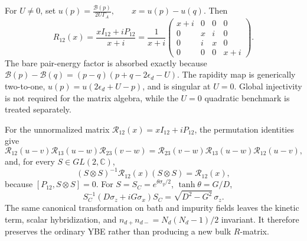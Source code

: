 \documentclass[%
  aps,physrev,onecolumn,10pt,amsmath,amssymb,superscriptaddress,longbibliography,floatfix
]{revtex4-2}
\begin{document}
For \(U\ne0\), set $u(p)=\frac{\mathcal B(p)}{2U\Gamma_A},\qquad x=u(p)-u(q)$.
Then
\begin{equation}
R_{12}(x)=\frac{xI_{12}+iP_{12}}{x+i}
=\frac{1}{x+i}
\begin{pmatrix}
x+i&0&0&0\\
0&x&i&0\\
0&i&x&0\\
0&0&0&x+i
\end{pmatrix}.
\label{eq:R4_explicit_app}
\end{equation}
The bare pair-energy factor is absorbed exactly because $\mathcal B(p)-\mathcal B(q) =(p-q)(p+q-2\epsilon_d-U)$.
The rapidity map is generically two-to-one,
\(u(p)=u(2\epsilon_d+U-p)\), and is singular at \(U=0\).  Global
injectivity is not required for the matrix algebra, while the \(U=0\)
quadratic benchmark is treated separately.

For the unnormalized matrix
\(\mathcal R_{12}(x)=xI_{12}+iP_{12}\), the permutation identities give
\begin{equation}
\mathcal R_{12}(u-v)\mathcal R_{13}(u-w)\mathcal R_{23}(v-w)
=\mathcal R_{23}(v-w)\mathcal R_{13}(u-w)\mathcal R_{12}(u-v),
\label{eq:YBE_app}
\end{equation}
and, for every \(S\in GL(2,\mathbb C)\),
\begin{equation}
(S\otimes S)^{-1}\mathcal R_{12}(x)(S\otimes S)
=\mathcal R_{12}(x),
\label{eq:R_GL2_app}
\end{equation}
because \([P_{12},S\otimes S]=0\).  For
\(S=S_C=e^{\theta\sigma_y/2}\), \(\tanh\theta=G/D\),
\begin{equation}
S_C^{-1}(D\sigma_z+iG\sigma_x)S_C
=\sqrt{D^2-G^2}\,\sigma_z .
\label{eq:CPT_diag_app}
\end{equation}
The same canonical transformation on bath and impurity fields leaves the
kinetic term, scalar hybridization, and
\(n_{d+}n_{d-}=N_d(N_d-1)/2\) invariant.  It therefore preserves the
ordinary YBE rather than producing a new bulk \(R\)-matrix.
\end{document}

